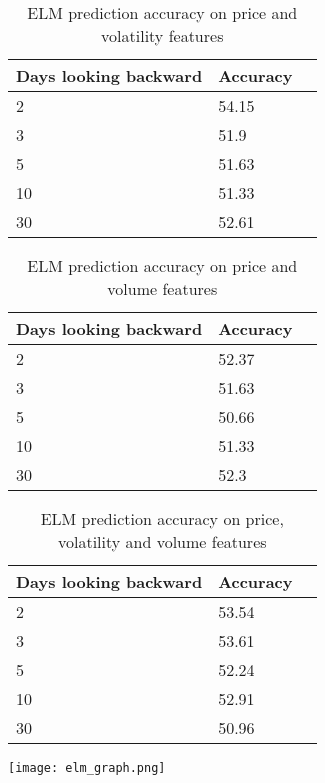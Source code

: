 \documentclass{article}
\begin{document}
\begin{table}[!h]
\begin{center}
    \begin{tabular}{ | l | l | p{3cm} |}
    \hline
    Days looking backward & Accuracy \\ \hline
    2 & 54.15  \\ \hline
    3 & 51.9  \\ \hline
    5 & 51.63  \\ \hline
    10 & 51.33  \\ \hline
    30 & 52.61 \\ 
    \hline
    \end{tabular}
\caption{ELM prediction accuracy on price and volatility features}
\end{center}
\end{table}

\begin{table}[h]
\begin{center}
    \begin{tabular}{ | l | l | p{3cm} |}
    \hline
    Days looking backward & Accuracy \\ \hline
    2 & 52.37  \\ \hline
    3 & 51.63  \\ \hline
    5 & 50.66  \\ \hline
    10 & 51.33  \\ \hline
    30 & 52.3 \\ 
    \hline
    \end{tabular}
\caption{ELM prediction accuracy on price and volume features}
\end{center}
\end{table}

\begin{table}[!h]
\begin{center}
    \begin{tabular}{ | l | l | p{3cm} |}
    \hline
    Days looking backward & Accuracy \\ \hline
    2 & 53.54  \\ \hline
    3 & 53.61  \\ \hline
    5 & 52.24  \\ \hline
    10 & 52.91  \\ \hline
    30 & 50.96 \\ 
    \hline
    \end{tabular}
\caption{ELM prediction accuracy on price, volatility and volume features}
\end{center}
\end{table}
\texttt{[image: elm\_graph.png]}
\end{document}
